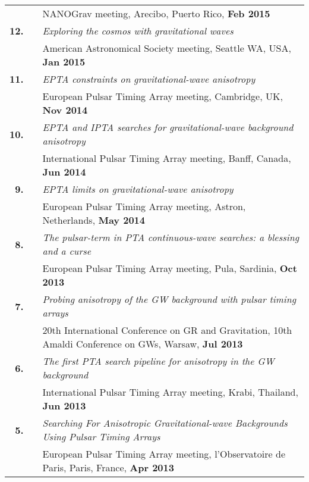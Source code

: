 \documentclass[11pt,letterpaper,sans]{moderncv}
\begin{document}
{\begin{longtable}{rp{0.3cm}p{15.8cm}}
&& NANOGrav meeting, Arecibo, Puerto Rico, \textbf{Feb 2015} \vspace{0.09cm}\\
\textbf{12.} & & \textit{Exploring the cosmos with gravitational waves} \\ 
&& American Astronomical Society meeting, Seattle WA, USA, \textbf{Jan 2015} \vspace{0.09cm}\\
\textbf{11.} & & \textit{EPTA constraints on gravitational-wave anisotropy} \\ 
&& European Pulsar Timing Array meeting, Cambridge, UK, \textbf{Nov 2014} \vspace{0.09cm}\\
\textbf{10.} & & \textit{EPTA and IPTA searches for gravitational-wave background anisotropy} \\ 
&& International Pulsar Timing Array meeting, Banff, Canada, \textbf{Jun 2014} \vspace{0.09cm}\\
\textbf{9.} & & \textit{EPTA limits on gravitational-wave anisotropy} \\ 
&& European Pulsar Timing Array meeting, Astron, Netherlands, \textbf{May 2014} \vspace{0.09cm}\\
\textbf{8.} & & \textit{The pulsar-term in PTA continuous-wave searches: a blessing and a curse} \\ 
&& European Pulsar Timing Array meeting, Pula, Sardinia, \textbf{Oct 2013} \vspace{0.09cm}\\
\textbf{7.} & & \textit{Probing anisotropy of the GW background with pulsar timing arrays} \\ 
&& 20th International Conference on GR and Gravitation, 10th Amaldi Conference on GWs, Warsaw, \textbf{Jul 2013} \vspace{0.09cm}\\
\textbf{6.} & & \textit{The first PTA search pipeline for anisotropy in the GW background} \\ 
&& International Pulsar Timing Array meeting, Krabi, Thailand, \textbf{Jun 2013} \vspace{0.09cm}\\
\textbf{5.} & & \textit{Searching For Anisotropic Gravitational-wave Backgrounds Using Pulsar Timing Arrays} \\ 
&& European Pulsar Timing Array meeting, l'Observatoire de Paris, Paris, France, \textbf{Apr 2013} \vspace{0.09cm}\\

\end{longtable}}
\end{document}
